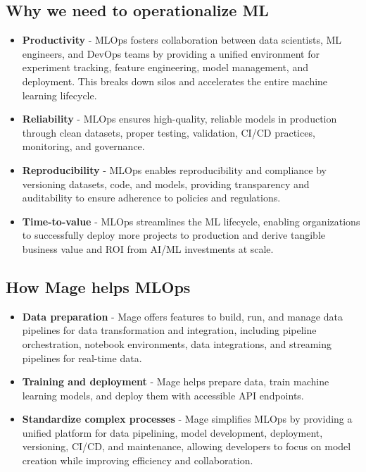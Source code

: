 \documentclass[letterpaper,12pt,notitlepage,twoside]{report}
\begin{document}
\subsection{Why we need to operationalize ML}
\begin{itemize}[noitemsep, topsep=0pt]
\item \textbf{Productivity} - MLOps fosters collaboration between data scientists, ML engineers, and DevOps teams by providing a unified environment for experiment tracking, feature engineering, model management, and deployment. This breaks down silos and accelerates the entire machine learning lifecycle.
\item \textbf{Reliability} - MLOps ensures high-quality, reliable models in production through clean datasets, proper testing, validation, CI/CD practices, monitoring, and governance.
\item \textbf{Reproducibility} - MLOps enables reproducibility and compliance by versioning datasets, code, and models, providing transparency and auditability to ensure adherence to policies and regulations.
\item \textbf{Time-to-value} - MLOps streamlines the ML lifecycle, enabling organizations to successfully deploy more projects to production and derive tangible business value and ROI from AI/ML investments at scale.
\end{itemize}

\subsection{How Mage helps MLOps}
\begin{itemize}[noitemsep, topsep=0pt]
\item \textbf{Data preparation} - Mage offers features to build, run, and manage data pipelines for data transformation and integration, including pipeline orchestration, notebook environments, data integrations, and streaming pipelines for real-time data.
\item \textbf{Training and deployment} - Mage helps prepare data, train machine learning models, and deploy them with accessible API endpoints.
\item \textbf{Standardize complex processes} - Mage simplifies MLOps by providing a unified platform for data pipelining, model development, deployment, versioning, CI/CD, and maintenance, allowing developers to focus on model creation while improving efficiency and collaboration.
\end{itemize}
\end{document}
